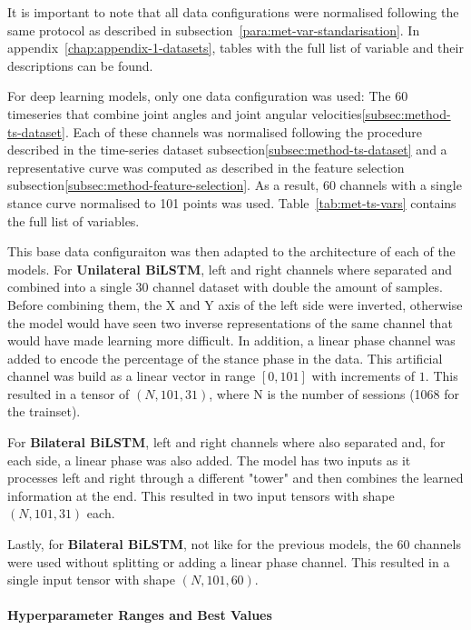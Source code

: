 It is important to note that all data configurations were normalised following the same protocol as described in subsection~\ref{para:met-var-standarisation}. In appendix~\ref{chap:appendix-1-datasets}, tables with the full list of variable and their descriptions can be found.

For deep learning models, only one data configuration was used: The 60 timeseries that combine joint angles and joint angular velocities\ref{subsec:method-ts-dataset}. Each of these \glspl{channel} was normalised following the procedure described in the time-series dataset subsection\ref{subsec:method-ts-dataset} and a representative curve was computed as described in the feature selection subsection\ref{subsec:method-feature-selection}. As a result, 60 channels with a single stance curve normalised to 101 points was used. Table~\ref{tab:met-ts-vars} contains the full list of variables.

This base data configuraiton was then adapted to the architecture of each of the models. For \textbf{Unilateral BiLSTM}, left and right channels where separated and combined into a single 30 channel dataset with double the amount of samples. Before combining them, the X and Y axis of the left side were inverted, otherwise the model would have seen two inverse representations of the same channel that would have made learning more difficult. In addition, a linear phase channel was added to encode the percentage of the stance phase in the data. This artificial channel was build as a linear vector in range $[0, 101]$ with increments of $1$. This resulted in a tensor of $(N, 101, 31)$, where N is the number of sessions (1068 for the trainset).

For \textbf{Bilateral BiLSTM}, left and right channels where also separated and, for each side, a linear phase was also added. The model has two inputs as it processes left and right through a different "tower" and then combines the learned information at the end. This resulted in two input tensors with shape $(N, 101, 31)$ each.

Lastly, for \textbf{Bilateral BiLSTM}, not like for the previous models, the 60 channels were used without splitting or adding a linear phase channel. This resulted in a single input tensor with shape $(N, 101, 60)$.

\paragraph{Hyperparameter Ranges and Best Values}

